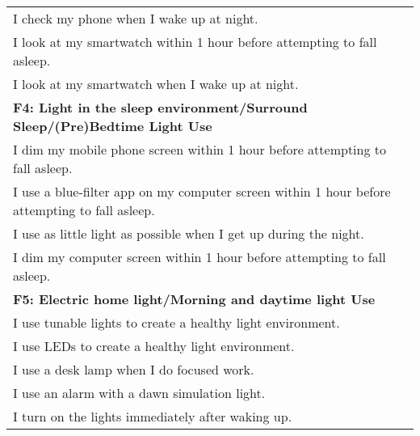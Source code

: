 \documentclass[
  english,
  man,floatsintext]{apa6}
\begin{document}
\begin{longtable}[]{@{}
  >{\raggedright\arraybackslash}p{}@{}}
I check my phone when I wake up at night. \\
I look at my smartwatch within 1 hour before attempting to fall asleep. \\
I look at my smartwatch when I wake up at night. \\
\textbf{F4: Light in the sleep environment/Surround Sleep/(Pre)Bedtime Light Use} \\
I dim my mobile phone screen within 1 hour before attempting to fall asleep. \\
I use a blue-filter app on my computer screen within 1 hour before attempting to fall asleep. \\
I use as little light as possible when I get up during the night. \\
I dim my computer screen within 1 hour before attempting to fall asleep. \\
\textbf{F5: Electric home light/Morning and daytime light Use} \\
I use tunable lights to create a healthy light environment. \\
I use LEDs to create a healthy light environment. \\
I use a desk lamp when I do focused work. \\
I use an alarm with a dawn simulation light. \\
I turn on the lights immediately after waking up. \\
\bottomrule
\end{longtable}

\newpage
\end{document}
